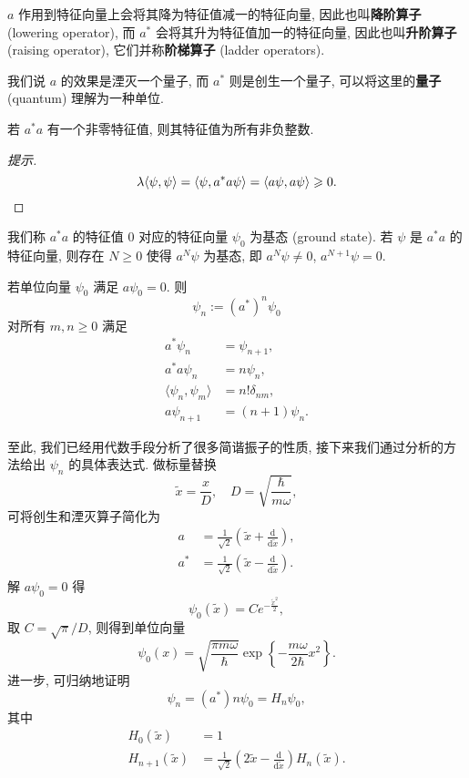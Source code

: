 $ a $ 作用到特征向量上会将其降为特征值减一的特征向量, 因此也叫{\bf 降阶算子} (lowering operator), 而 $ a^* $ 会将其升为特征值加一的特征向量, 因此也叫{\bf 升阶算子} (raising operator), 它们并称{\bf 阶梯算子} (ladder operators). 
    
我们说 $ a $ 的效果是湮灭一个量子, 而 $ a^* $ 则是创生一个量子, 可以将这里的{\bf 量子} (quantum) 理解为一种单位.

\begin{corollary}
    若 $ a^*a $ 有一个非零特征值, 则其特征值为所有非负整数.
\end{corollary}
\begin{proof}[提示]\keepline
    \[ \lambda\langle \psi,\psi \rangle=\langle \psi,a^*a\psi \rangle=\langle a\psi,a\psi \rangle\geqslant 0.\qedhere \]
\end{proof}
我们称 $ a^*a $ 的特征值 $ 0 $ 对应的特征向量 $ \psi_0 $ 为基态 (ground state). 若 $ \psi $ 是 $ a^*a $ 的特征向量, 则存在 $ N\geqslant 0 $ 使得 $ a^N\psi $ 为基态, 即 $ a^N\psi\neq 0 $, $ a^{N+1}\psi=0 $.
\begin{proposition}
    若单位向量 $ \psi_0 $ 满足 $ a\psi_0=0 $. 则
    \[ \psi_n:=(a^*)^n\psi_0 \]
    对所有 $ m,n\geqslant 0 $ 满足 
    \begin{align*}
        a^*\psi_n &= \psi_{n+1},\\ 
        a^*a\psi_n &= n\psi_n,\\ 
        \langle \psi_n,\psi_m \rangle &= n!\delta_{nm},\\ 
        a\psi_{n+1} &= (n+1)\psi_n.
    \end{align*}
\end{proposition}

至此, 我们已经用代数手段分析了很多简谐振子的性质, 接下来我们通过分析的方法给出 $ \psi_n $ 的具体表达式. 做标量替换
\[ \tilde{x}=\frac{x}{D},\quad D=\sqrt{\frac{\hbar}{m\omega}}, \]
可将创生和湮灭算子简化为
\begin{align*}
    a &= \frac{1}{\sqrt{2}}\left( \tilde{x}+\frac{\mathrm{d}}{\mathrm{d}\tilde{x}} \right),\\ 
    a^* &= \frac{1}{\sqrt{2}}\left( \tilde{x}-\frac{\mathrm{d}}{\mathrm{d}\tilde{x}} \right).
\end{align*}
解 $ a\psi_0=0 $ 得
\[ \psi_0(\tilde{x})=Ce^{-\frac{\tilde{x}^2}{2}}, \]
取 $ C=\sqrt{\pi}/D $, 则得到单位向量
\[ \psi_0(x)=\sqrt{\frac{\pi m\omega}{\hbar}}\exp\left\{ -\frac{m\omega}{2\hbar}x^2 \right\}. \]
进一步, 可归纳地证明
\[ \psi_n=(a^*)n\psi_0=H_n\psi_0, \]
其中
\begin{align*}
    H_0(\tilde{x}) &= 1\\ 
    H_{n+1}(\tilde{x}) &= \frac{1}{\sqrt{2}}\left( 2\tilde{x}-\frac{\mathrm{d}}{\mathrm{d}\tilde{x}} \right)H_n(\tilde{x}).
\end{align*}

